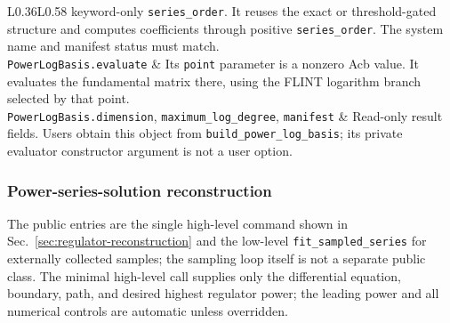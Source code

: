 \documentclass[11pt]{article}
\begin{document}
\begin{longtable}{L{0.36\textwidth}L{0.58\textwidth}}
keyword-only \texttt{series\_order}.  It reuses the exact or
threshold-gated structure and computes coefficients through positive
\texttt{series\_order}.  The system name and manifest status must match. \\
\texttt{PowerLogBasis.evaluate} & Its \texttt{point} parameter is a nonzero Acb value.  It
evaluates the fundamental matrix there, using the FLINT logarithm branch selected by that
point. \\
\texttt{PowerLogBasis.dimension}, \texttt{maximum\_log\_degree}, \texttt{manifest} &
Read-only result fields.  Users obtain this object from \texttt{build\_power\_log\_basis};
its private evaluator constructor argument is not a user option. \\
\bottomrule
\end{longtable}
\normalsize

\subsubsection{Power-series-solution reconstruction}

The public entries are the single high-level command shown in
Sec.~\ref{sec:regulator-reconstruction} and the low-level \texttt{fit\_sampled\_series} for
externally collected samples; the sampling loop itself is not a separate public class.
The minimal high-level call supplies only the differential equation, boundary, path, and
desired highest regulator power; the leading power and all numerical controls are automatic
unless overridden.
\end{document}
